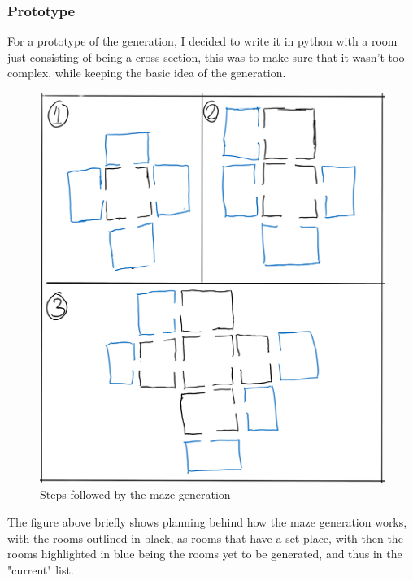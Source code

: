 \documentclass{article}
\begin{document}
            \subsubsection{Prototype}
            For a prototype of the generation, I decided to write it in python with a room just consisting of being a cross section, this was to make sure that it wasn't too complex, while keeping the basic idea of the generation.
            \begin{figure}[hbt!]
                \centerline{\includegraphics[scale=0.5]{img/Design/Maze Generation.png}}
                \caption{Steps followed by the maze generation}
                \label{fig}
            \end{figure}

            The figure above briefly shows planning behind how the maze generation works, with the rooms outlined in black, as rooms that have a set place, with then the rooms highlighted in blue being the rooms yet to be generated, and thus in the "current" list.

            \clearpage
            
\end{document}
